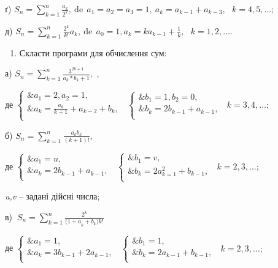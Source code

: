 \documentclass[]{article}
\begin{document}
ґ)
\(S_{n} = \sum_{k = 1}^{n}\frac{a_{k}}{2^{k}},\mathrm{\ de\ \ }a_{1} = a_{2} = a_{3} = 1,\ a_{k} = a_{k - 1} + a_{k - 3},\mathrm{\text{\ \ }}k = 4,5,\ldots;\)

д)
\(S_{n} = \sum_{k = 1}^{n}{\frac{2^{k}}{k!}a_{k}},\mathrm{\ de\ \ }a_{0} = 1,a_{k} = ka_{k - 1} + \frac{1}{k},\mathrm{\text{\ \ }}k = 1,2,\ldots.\)

\begin{enumerate}
\def\labelenumi{\arabic{enumi})}
\item
  \protect\hypertarget{_Hlk65241776}{}{}Скласти програми для обчислення
  сум:
\end{enumerate}

а) \(S_{n} = \sum_{k = 1}^{n}\frac{3^{2k + 1}}{a_{k}*b_{k} + 1},\) ,

де \(\left\{ \begin{matrix}
\& a_{1} = 2,a_{2} = 1, \\
\& a_{k} = \frac{a_{k}}{k + 1} + a_{k - 2} + b_{k}, \\
\end{matrix} \right.\ \) \(\left\{ \begin{matrix}
\& b_{1} = 1,b_{2} = 0, \\
\& b_{k} = 2b_{k - 1} + a_{k - 1}, \\
\end{matrix} \right.\ \) \(k = 3,4,\ldots;\)

б) \(S_{n} = \sum_{k = 1}^{n}\frac{a_{k}b_{k}}{(k + 1)!},\)

де \(\left\{ \begin{matrix}
\& a_{1} = u, \\
\& a_{k} = 2b_{k - 1} + a_{k - 1}, \\
\end{matrix} \right.\ \) \(\left\{ \begin{matrix}
\& b_{1} = v, \\
\& b_{k} = 2a_{k = 1}^{2} + b_{k - 1}, \\
\end{matrix} \right.\ \) \(k = 2,3,\ldots;\)

\emph{u,v} -- задані дійсні числа;

в)
\(\ S_{n} = \sum_{k = 1}^{n}\frac{2^{k}}{{(1 + a}_{k} + b_{k}){k!}^{}}\)

де \(\left\{ \begin{matrix}
\& a_{1} = 1, \\
\& a_{k} = 3b_{k - 1} + 2a_{k - 1}, \\
\end{matrix} \right.\ \) \(\left\{ \begin{matrix}
\& b_{1} = 1, \\
\& b_{k} = 2a_{k - 1} + b_{k - 1}, \\
\end{matrix} \right.\ \) \(k = 2,3,\ldots;\)
\end{document}
